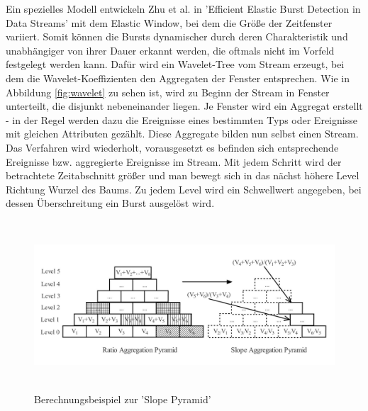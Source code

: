 Ein spezielles Modell entwickeln Zhu et al. in 'Efficient Elastic Burst Detection in Data Streams' \cite{Zhu:2003:EEB:956750.956789} mit dem Elastic Window, bei dem   die Größe der Zeitfenster variiert. Somit können die Bursts dynamischer durch deren Charakteristik und unabhängiger von ihrer Dauer erkannt werden, die oftmals nicht im Vorfeld festgelegt werden kann. Dafür wird ein Wavelet-Tree vom Stream erzeugt, bei dem die Wavelet-Koeffizienten den Aggregaten der Fenster entsprechen. Wie in Abbildung \ref{fig:wavelet} zu sehen ist, wird zu Beginn der Stream in Fenster unterteilt, die disjunkt nebeneinander liegen. Je Fenster wird ein Aggregat erstellt - in der Regel werden dazu die Ereignisse eines bestimmten Typs oder Ereignisse mit gleichen Attributen gezählt. Diese Aggregate bilden nun selbst einen Stream. Das Verfahren wird wiederholt, vorausgesetzt es befinden sich entsprechende Ereignisse bzw. aggregierte Ereignisse im Stream. Mit jedem Schritt wird der betrachtete Zeitabschnitt größer und man bewegt sich in das nächst höhere Level Richtung Wurzel des Baums. Zu jedem Level wird ein Schwellwert angegeben, bei dessen Überschreitung ein Burst ausgelöst wird.\\

\begin{figure}[h]
\centerline{\includegraphics[height=6.3cm]{images/slopepyramid.jpg}}
\caption{Berechnungsbeispiel zur 'Slope Pyramid' \cite{yuan2007online}}
\label{fig:slopepyramid}
\end{figure}




